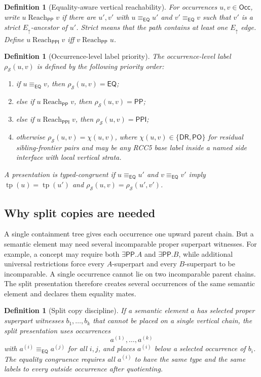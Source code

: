 \documentclass[11pt]{article}
\newtheorem{definition}[theorem]{Definition}
\newcommand{\EQ}{\mathsf{EQ}}
\newcommand{\DR}{\mathsf{DR}}
\newcommand{\PO}{\mathsf{PO}}
\newcommand{\PP}{\mathsf{PP}}
\newcommand{\PPI}{\mathsf{PPI}}
\newcommand{\Occ}{\mathsf{Occ}}
\newcommand{\typ}{\operatorname{tp}}
\newcommand{\eqc}{\equiv_{\EQ}}
\newcommand{\reach}{\operatorname{Reach}}
\begin{document}
\begin{definition}[Equality-aware vertical reachability]\label{def:eq-aware-vertical}
For occurrences $u,v\in\Occ$, write $u\reach_\PP v$ if there are $u',v'$ with $u\eqc u'$ and $v'\eqc v$ such that $v'$ is a strict $E_\uparrow$-ancestor of $u'$.  Strict means that the path contains at least one $E_\uparrow$ edge.  Define $u\reach_\PPI v$ iff $v\reach_\PP u$.
\end{definition}

\begin{definition}[Occurrence-level label priority]\label{def:priority-label}
The occurrence-level label $\rho_\mathcal S(u,v)$ is defined by the following priority order:
\begin{enumerate}[label=(L\arabic*)]
\item if $u\eqc v$, then $\rho_\mathcal S(u,v)=\EQ$;
\item else if $u\reach_\PP v$, then $\rho_\mathcal S(u,v)=\PP$;
\item else if $u\reach_\PPI v$, then $\rho_\mathcal S(u,v)=\PPI$;
\item otherwise $\rho_\mathcal S(u,v)=\chi(u,v)$, where $\chi(u,v)\in\{\DR,\PO\}$ for residual sibling-frontier pairs and may be any RCC5 base label inside a named side interface with local vertical strata.
\end{enumerate}
A presentation is typed-congruent if $u\eqc u'$ and $v\eqc v'$ imply $\typ(u)=\typ(u')$ and $\rho_\mathcal S(u,v)=\rho_\mathcal S(u',v')$.
\end{definition}

\subsection{Why split copies are needed}

A single containment tree gives each occurrence one upward parent chain.  But a semantic element may need several incomparable proper superpart witnesses.  For example, a concept may require both $\exists\PP.A$ and $\exists\PP.B$, while additional universal restrictions force every $A$-superpart and every $B$-superpart to be incomparable.  A single occurrence cannot lie on two incomparable parent chains.  The split presentation therefore creates several occurrences of the same semantic element and declares them equality mates.

\begin{definition}[Split copy discipline]\label{def:split-copy}
If a semantic element $a$ has selected proper superpart witnesses $b_1,\ldots,b_k$ that cannot be placed on a single vertical chain, the split presentation uses occurrences
\[
  a^{(1)},\ldots,a^{(k)}
\]
with $a^{(i)}\eqc a^{(j)}$ for all $i,j$, and places $a^{(i)}$ below a selected occurrence of $b_i$.  The equality congruence requires all $a^{(i)}$ to have the same type and the same labels to every outside occurrence after quotienting.
\end{definition}
\end{document}
